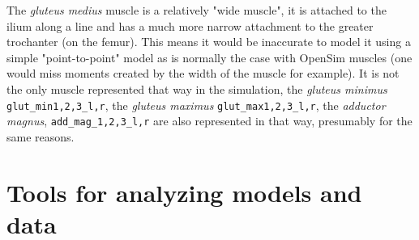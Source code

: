 \documentclass[11pt]{article}
\begin{document}
\begin{enumerate}
    \begin{adjustwidth}{0.5cm}{}
        The \textit{gluteus medius} muscle is a relatively "wide muscle", it is attached to the ilium along a line and has a much more narrow attachment to the greater trochanter (on the femur). This means it would be inaccurate to model it using a simple "point-to-point" model as is normally the case with OpenSim muscles (one would miss moments created by the width of the muscle for example). 
        \BlankLine
        It is not the only muscle represented that way in the simulation, the \textit{gluteus minimus} \texttt{glut\_min1,2,3\_l,r}, the \textit{gluteus maximus} \texttt{glut\_max1,2,3\_l,r}, the \textit{adductor magnus}, \texttt{add\_mag\_1,2,3\_l,r} are also represented in that way, presumably for the same reasons.
    \end{adjustwidth}
\end{enumerate}

\section{Tools for analyzing models and data}
\end{document}
